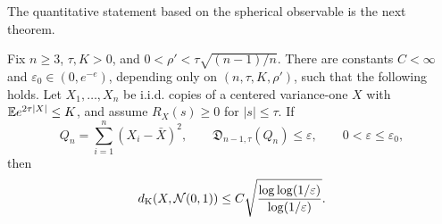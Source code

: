 The quantitative statement based on the spherical observable is the next theorem.
\begin{theorem}\label{thm:sample-var}
Fix $n\ge3$, $\tau,K>0$, and $0<\rho'<\tau\sqrt{(n-1)/n}$. There are constants $C<\infty$ and $\varepsilon_0\in(0,e^{-e})$, depending only on $(n,\tau,K,\rho')$, such that the following holds. Let $X_1,\ldots,X_n$ be i.i.d. copies of a centered variance-one $X$ with $\mathbb E e^{2\tau|X|}\le K$, and assume $R_X(s)\ge0$ for $|s|\le\tau$. If
\[
Q_n=\sum_{i=1}^n(X_i-\bar X)^2,
\qquad
\mathfrak D_{n-1,\tau}(Q_n)\le\varepsilon,\qquad 0<\varepsilon\le\varepsilon_0,
\]
then
\[
d_{\mathrm K}(X,\mathcal N(0,1))
\le C\sqrt{\frac{\log\log(1/\varepsilon)}{\log(1/\varepsilon)}}.
\]
\end{theorem}

